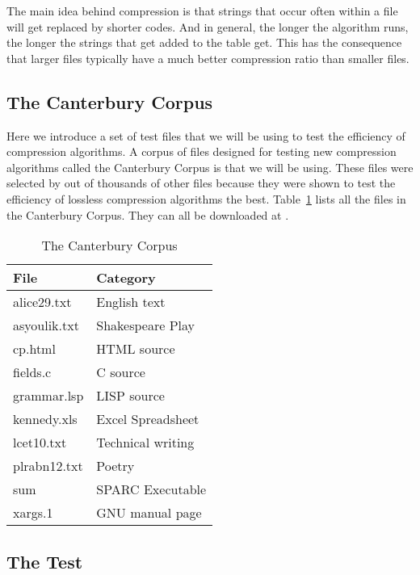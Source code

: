 The main idea behind \lzw compression is that strings that occur often
within a file will get replaced by shorter codes. And in general, the
longer the algorithm runs, the longer the strings that get added to
the table get. This has the consequence that larger files typically
have a much better compression ratio than smaller files.

\subsection{The Canterbury Corpus}

Here we introduce a set of test files that we will be using to test
the efficiency of compression algorithms. A corpus of files designed
for testing new compression algorithms called the Canterbury Corpus is
that we will be using. These files were selected by
\cite{arnold:corpus} out of thousands of other files because they were
shown to test the efficiency of lossless compression algorithms the
best. Table~\ref{tab:corp-files} lists all the files in the Canterbury
Corpus. They can all be downloaded at \cite{powell:desc-corp}.

\begin{table}
  \centering
  \begin{tabular}{ll}
    \toprule
    File & Category \\
    \midrule
    alice29.txt & English text \\
    asyoulik.txt & Shakespeare Play \\
    cp.html & HTML source \\
    fields.c & C source \\
    grammar.lsp & LISP source \\
    kennedy.xls & Excel Spreadsheet \\
    lcet10.txt & Technical writing \\
    plrabn12.txt & Poetry \\
    sum & SPARC Executable \\
    xargs.1 & GNU manual page \\
    \bottomrule

  \end{tabular}
  \caption{The Canterbury Corpus}
  \label{tab:corp-files}
\end{table}

\subsection{The Test}

